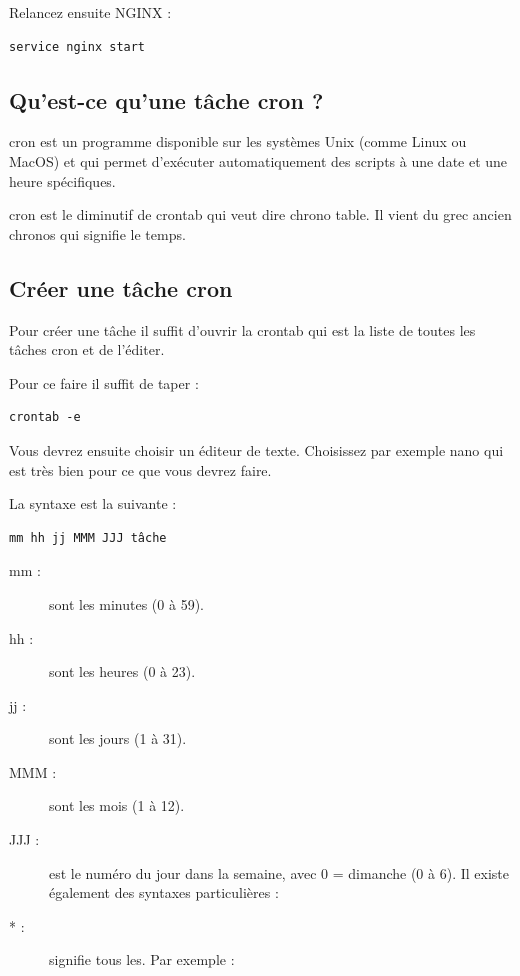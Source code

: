 \documentclass{article}
\begin{document}
Relancez ensuite NGINX :
\begin{verbatim}
service nginx start
\end{verbatim}

\subsection{Qu'est-ce qu'une tâche cron ?}
cron est un programme disponible sur les systèmes Unix (comme Linux ou MacOS) et qui permet d'exécuter automatiquement des scripts à une date et une heure spécifiques.

cron est le diminutif de crontab qui veut dire chrono table. Il vient du grec ancien chronos qui signifie le temps.

\subsection{Créer une tâche cron}
Pour créer une tâche il suffit d'ouvrir la crontab qui est la liste de toutes les tâches cron et de l'éditer.

Pour ce faire il suffit de taper :
\begin{verbatim}
crontab -e
\end{verbatim}

Vous devrez ensuite choisir un éditeur de texte. Choisissez par exemple nano qui est très bien pour ce que vous devrez faire.

La syntaxe est la suivante :
\begin{verbatim}
mm hh jj MMM JJJ tâche
\end{verbatim}
\begin{description}
\item[mm : ] sont les minutes (0 à 59).
\item[hh : ] sont les heures (0 à 23).
\item[jj : ] sont les jours (1 à 31).
\item[MMM : ] sont les mois (1 à 12).
\item[JJJ : ] est le numéro du jour dans la semaine, avec 0 = dimanche (0 à 6). Il existe également des syntaxes particulières :
\item[* : ] signifie tous les. Par exemple :
\end{description}
\end{document}
